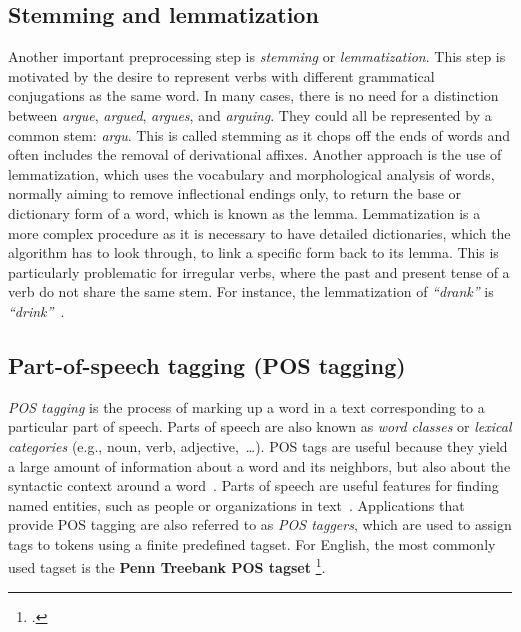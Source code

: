\subsection{Stemming and  lemmatization}\label{subsec:steming}
Another important preprocessing step is \emph{stemming} or \emph{lemmatization}. This step is motivated by the desire to represent verbs with different grammatical conjugations as the same word.
In many cases, there is no need for a distinction between \emph{argue}, \emph{argued}, \emph{argues}, and \emph{arguing}. They could all be represented by a common stem: \emph{argu}. This is called stemming as it chops off the ends of words and often includes the removal of derivational affixes. Another approach is the use of lemmatization, which uses the vocabulary and morphological analysis of words, normally aiming to remove inflectional endings only, to return the base or dictionary form of a word, which is known as the lemma. Lemmatization is a more complex procedure as it is necessary to have detailed dictionaries, which the algorithm has to look through, to link a specific form back to its lemma. This is particularly problematic for irregular verbs, where the past and present tense of a verb do not share the same stem. For instance,
the lemmatization of \emph{``drank''} is \emph{``drink''}~.
\subsection{Part-of-speech tagging (POS tagging)}\label{subsec:pos}
\emph{POS tagging} is the process of marking up a word in a text corresponding to a particular part of speech. Parts of speech are also known as \emph{word classes} or \emph{lexical categories} (e.g., noun, verb, adjective,~\dots). POS tags are useful because they yield a large amount of information about a word and its neighbors, but also about the syntactic context around a word~. Parts of speech are useful features for finding named entities, such as people or organizations in text~. Applications that provide POS tagging are also referred to as \emph{POS taggers}, which are used to assign tags to tokens using a finite predefined tagset. For English, the most commonly used tagset is the \textbf{Penn Treebank POS tagset} \footcite{https://www.ling.upenn.edu/courses/Fall_2003/ling001/penn_treebank_pos.html}. 
